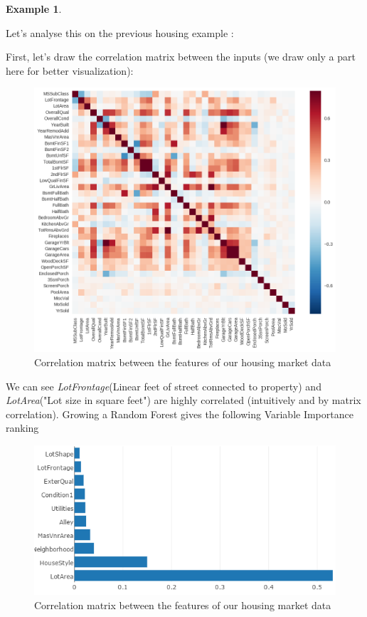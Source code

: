 \documentclass[english,11pt,openany]{report}
\theoremstyle{definition}
\theoremstyle{plain}
\theoremstyle{definition}
\newtheorem{Ex}[Th]{Example}
\begin{document}
\begin{appendices}
\begin{Ex}
\end{Ex}

Let's analyse this on the previous housing example :

First, let's draw the correlation matrix between the inputs (we draw only a part here for better visualization): 

\begin{figure}[H]
	\label{figure:correlation_matrix}
	\includegraphics[scale=0.5]{RF_analysis/correlation_matrix.png} 
	\caption{Correlation matrix between the features of our housing market data}
\end{figure}

We can see \textit{LotFrontage}(Linear feet of street connected to property) and \textit{LotArea}("Lot size in square feet") are highly correlated (intuitively and by matrix correlation).
Growing a Random Forest gives the following Variable Importance ranking


\begin{figure}[H]
	\label{figure:vi}
	\includegraphics[scale=0.6]{RF_analysis/vi.png} 
	\caption{Correlation matrix between the features of our housing market data}
\end{figure}



\end{appendices}
\end{document}
